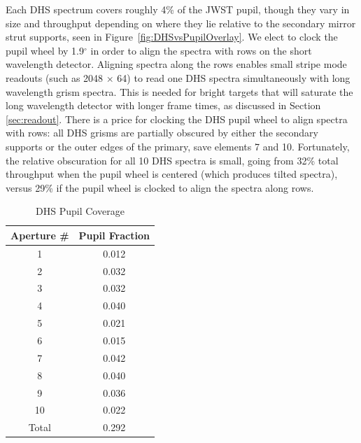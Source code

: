 \documentclass[iop]{emulateapj}
\begin{document}
Each DHS spectrum covers roughly 4\% of the JWST pupil, though they vary in size and throughput depending on where they lie relative to the secondary mirror strut supports, seen in Figure~\ref{fig:DHSvsPupilOverlay}.
We elect to clock the pupil wheel by 1.9$^\circ$ in order to align the spectra with rows on the short wavelength detector.
Aligning spectra along the rows enables small stripe mode readouts (such as 2048 $\times$ 64) to read one DHS spectra simultaneously with long wavelength grism spectra.
This is needed for bright targets that will saturate the long wavelength detector with longer frame times, as discussed in Section \ref{sec:readout}.
There is a price for clocking the DHS pupil wheel to align spectra with rows: all DHS grisms are partially obscured by either the secondary supports or the outer edges of the primary, save elements 7 and 10.
Fortunately, the relative obscuration for all 10 DHS spectra is small, going from 32\% total throughput when the pupil wheel is centered (which produces tilted spectra), versus 29\% if the pupil wheel is clocked to align the spectra along rows.

\begin{table}[!b]
\centering
\caption{DHS Pupil Coverage}\label{tab:pupfrac}
\begin{tabular}{cc}
\hline \hline
Aperture \# & Pupil Fraction \\
\hline \hline
1  & 0.012 \\
2  & 0.032 \\
3  & 0.032 \\
4  & 0.040 \\
5  & 0.021 \\
6  & 0.015 \\
7  & 0.042 \\
8  & 0.040 \\
9  & 0.036 \\
10 & 0.022 \\
\hline
Total & 0.292\\
\hline
\end{tabular}
\end{table}
\end{document}
